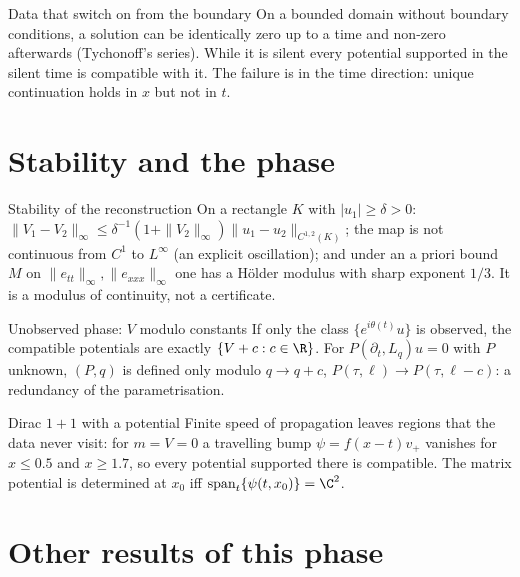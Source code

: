 \begin{falsebox}{Data that switch on from the boundary}{\falsest}
On a bounded domain without boundary conditions, a solution can be identically zero up to a time and non-zero afterwards (Tychonoff's series). While it is silent every potential supported in the silent time is compatible with it. The failure is in the time direction: unique continuation holds in $x$ but not in $t$.
\end{falsebox}

\section{Stability and the phase}

\begin{theorem}{Stability of the reconstruction  \proved}\label{thm:varp3}
On a rectangle $K$ with $|u_1|\ge\delta>0$: $\|V_1-V_2\|_\infty\le\delta^{-1}(1+\|V_2\|_\infty)\|u_1-u_2\|_{C^{1,2}(K)}$; the map is not continuous from $C^1$ to $L^\infty$ (an explicit oscillation); and under an a priori bound $M$ on $\|e_{tt}\|_\infty,\|e_{xxx}\|_\infty$ one has a H\"older modulus with sharp exponent $1/3$. It is a modulus of continuity, not a certificate.
\end{theorem}

\begin{theorem}{Unobserved phase: $V$ modulo constants  \proved}\label{thm:varp4}
If only the class $\{e^{i\theta(t)}u\}$ is observed, the compatible potentials are exactly $\{V+c:c\in\R\}$. For $P(\partial_t,L_q)u=0$ with $P$ unknown, $(P,q)$ is defined only modulo $q\to q+c$, $P(\tau,\ell)\to P(\tau,\ell-c)$: a redundancy of the parametrisation.
\end{theorem}

\begin{proposition}{Dirac $1+1$ with a potential  \proved}\label{prop:varp5}
Finite speed of propagation leaves regions that the data never visit: for $m=V=0$ a travelling bump $\psi=f(x-t)v_+$ vanishes for $x\le0.5$ and $x\ge1.7$, so every potential supported there is compatible. The matrix potential is determined at $x_0$ iff $\mathrm{span}_t\{\psi(t,x_0)\}=\C^2$.
\end{proposition}

\section{Other results of this phase}

